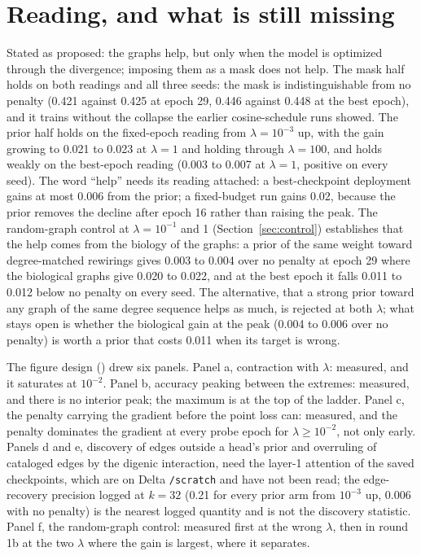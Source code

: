 
\section{Reading, and what is still missing}
\label{sec:reading}

Stated as proposed: the graphs help, but only when the model is optimized through the
divergence; imposing them as a mask does not help. The mask half holds on both readings
and all three seeds: the mask is indistinguishable from no penalty (0.421 against 0.425
at epoch 29, 0.446 against 0.448 at the best epoch), and it trains without the collapse
the earlier cosine-schedule runs showed. The prior half holds on the fixed-epoch reading
from $\lambda = 10^{-3}$ up, with the gain growing to 0.021 to 0.023 at $\lambda = 1$ and
holding through $\lambda = 100$, and holds weakly on the best-epoch reading (0.003 to
0.007 at $\lambda = 1$, positive on every seed). The word ``help'' needs its reading
attached: a best-checkpoint deployment gains at most 0.006 from the prior; a fixed-budget
run gains 0.02, because the prior removes the decline after epoch 16 rather than raising
the peak. The random-graph control at $\lambda = 10^{-1}$ and 1 (Section~\ref{sec:control})
establishes that the help comes from the biology of the graphs: a prior of the same
weight toward degree-matched rewirings gives 0.003 to 0.004 over no penalty at epoch 29
where the biological graphs give 0.020 to 0.022, and at the best epoch it falls 0.011 to
0.012 below no penalty on every seed. The alternative, that a strong prior toward any
graph of the same degree sequence helps as much, is rejected at both $\lambda$; what
stays open is whether the biological gain at the peak (0.004 to 0.006 over no penalty)
is worth a prior that costs 0.011 when its target is wrong.

The figure design ()
drew six panels. Panel a, contraction with $\lambda$: measured, and it saturates at
$10^{-2}$. Panel b, accuracy peaking between the extremes: measured, and there is no
interior peak; the maximum is at the top of the ladder. Panel c, the penalty carrying the
gradient before the point loss can: measured, and the penalty dominates the gradient at
every probe epoch for $\lambda \geq 10^{-2}$, not only early. Panels d and e, discovery
of edges outside a head's prior and overruling of cataloged edges by the digenic
interaction, need the layer-1 attention of the saved checkpoints, which are on Delta
\texttt{/scratch} and have not been read; the edge-recovery precision logged at $k =
32$ (0.21 for every prior arm from $10^{-3}$ up, 0.006 with no penalty) is the nearest
logged quantity and is not the discovery statistic. Panel f, the random-graph control:
measured first at the wrong $\lambda$, then in round 1b at the two $\lambda$ where the
gain is largest, where it separates.

